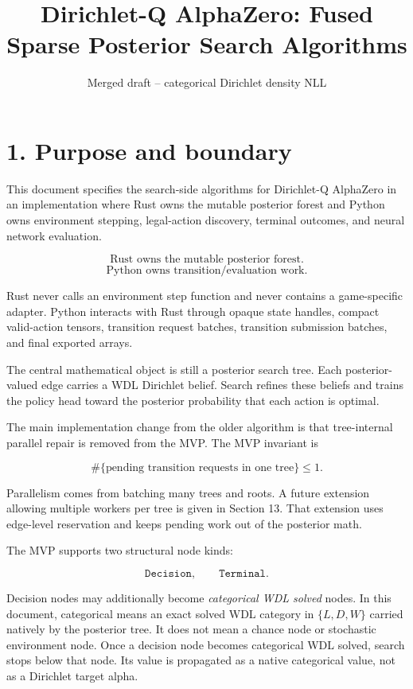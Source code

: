 \documentclass[11pt]{article}
\title{Dirichlet-Q AlphaZero: Fused Sparse Posterior Search Algorithms}
\author{}
\date{Merged draft -- categorical Dirichlet density NLL}
\begin{document}
\maketitle

\section*{1. Purpose and boundary}

This document specifies the search-side algorithms for Dirichlet-Q AlphaZero in
an implementation where Rust owns the mutable posterior forest and Python owns
environment stepping, legal-action discovery, terminal outcomes, and neural
network evaluation.

\[
\text{Rust owns the mutable posterior forest.}
\]
\[
\text{Python owns transition/evaluation work.}
\]

Rust never calls an environment step function and never contains a game-specific
adapter. Python interacts with Rust through opaque state handles, compact
valid-action tensors, transition request batches, transition submission batches,
and final exported arrays.

The central mathematical object is still a posterior search tree. Each
posterior-valued edge carries a WDL Dirichlet belief. Search refines these
beliefs and trains the policy head toward the posterior probability that each
action is optimal.

The main implementation change from the older algorithm is that tree-internal
parallel repair is removed from the MVP. The MVP invariant is

\[
\#\{\text{pending transition requests in one tree}\}\le 1.
\]

Parallelism comes from batching many trees and roots. A future extension allowing
multiple workers per tree is given in Section 13. That extension uses edge-level
reservation and keeps pending work out of the posterior math.

The MVP supports two structural node kinds:

\[
\texttt{Decision},
\qquad
\texttt{Terminal}.
\]

Decision nodes may additionally become \emph{categorical WDL solved} nodes. In
this document, categorical means an exact solved WDL category in
\(\{L,D,W\}\) carried natively by the posterior tree. It does not mean a chance
node or stochastic environment node. Once a decision node becomes categorical WDL
solved, search stops below that node. Its value is propagated as a native
categorical value, not as a Dirichlet target alpha.
\end{document}
